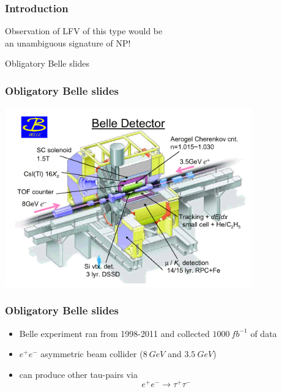 \documentclass[xcolor=table]{beamer}
\begin{document}



\begin{frame}
\frametitle{Introduction}

\begin{center}
Observation of LFV of this type would be \\an unambiguous signature of NP!
\end{center}

\end{frame}




\begin{frame}

\begin{center}
{\Huge Obligatory Belle slides}
\end{center}

\end{frame}



\begin{frame}
\frametitle{Obligatory Belle slides}

\begin{center}
\includegraphics[width=0.8\textwidth]{images/belle-detector.png}
\end{center}

\end{frame}




\begin{frame}
\frametitle{Obligatory Belle slides}

\begin{itemize}
\item Belle experiment ran from 1998-2011 and collected $\SI{1000}{fb^{-1}}$ of data
\item $e^+ e^-$ asymmetric beam collider ($\SI{8}{GeV}$ and $\SI{3.5}{GeV}$)
\item can produce other tau-pairs via
\begin{equation*}
e^+ e^- \to \tau^+ \tau^-
\end{equation*}
\end{itemize}


\end{frame}
\end{document}
